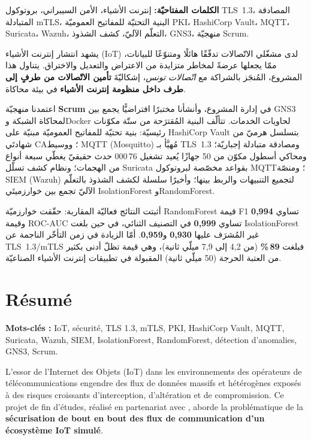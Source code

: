 \begin{Arabic}
\noindent\textbf{الكلمات المفتاحيّة:} إنترنت الأشياء، الأمن السيبراني، بروتوكول TLS~1.3، المصادقة المتبادلة mTLS، البنية التحتيّة للمفاتيح العموميّة PKI، HashiCorp Vault، MQTT، Suricata، Wazuh، التعلّم الآليّ، كشف الشذوذ، GNS3، منهجيّة Scrum.

\noindent يشهد انتشار إنترنت الأشياء (IoT) لدى مشغّلي الاتّصالات تدفّقًا هائلًا ومتنوّعًا للبيانات، ممّا يجعلها عرضةً لمخاطر متزايدة من الاعتراض والتعديل والاختراق. يتناول هذا المشروع، المُنجَز بالشراكة مع \emph{اتّصالات تونس}، إشكاليّةَ \textbf{تأمين الاتّصالات من طرفٍ إلى طرف داخل منظومة إنترنت الأشياء} في بيئة محاكاة.

\noindent اعتمدنا منهجيّة \textbf{Scrum} في إدارة المشروع، وأنشأنا مختبرًا افتراضيًّا يجمع بين GNS3 لمحاكاة الشبكة وDocker لحاويات الخدمات. تتألّف البنية المُقترَحة من ستّة مكوّنات رئيسيّة: بنية تحتيّة للمفاتيح العموميّة مبنيّة على HashiCorp Vault بتسلسل هرميّ من شهادتَي CA؛ ووسيط MQTT (Mosquitto) مُهيَّأ بـ TLS~1.3 ومصادقة متبادلة إجباريّة؛ ومحاكي أسطول مكوّن من 50 جهازًا يُعيد تشغيل 76\,000 حدث حقيقيّ يغطّي سبعة أنواع من الهجمات؛ ونظام كشف تسلّل Suricata بقواعد مخصّصة لبروتوكول MQTT؛ ومنصّة SIEM (Wazuh) لتجميع التنبيهات والربط بينها؛ وأخيرًا سلسلة لكشف الشذوذ بالتعلّم الآليّ تجمع بين خوارزميتَي IsolationForest وRandomForest.

\noindent أثبتت النتائج فعاليّة المقاربة: حقّقت خوارزميّة RandomForest قيمة F1 تساوي \textbf{0,994} وقيمة ROC-AUC تساوي \textbf{0,999} في التصنيف الثنائي، في حين بلغت IsolationForest غير المُشرَف عليها \textbf{0,930} و\textbf{0,959}. أمّا الزيادة في زمن التأخّر الناجمة عن TLS~1.3/mTLS فبلغت \textbf{89\,\%} (من 4{,}2 إلى 7{,}9 ميلّي ثانية)، وهي قيمة تظلّ أدنى بكثير من العتبة الحرجة (50 ميلّي ثانية) المقبولة في تطبيقات إنترنت الأشياء الصناعيّة.
\end{Arabic}

\cleardoublepage
\chapter*{Résumé}

\textbf{Mots-clés :} IoT, sécurité, TLS 1.3, mTLS, PKI, HashiCorp Vault, MQTT, Suricata, Wazuh, SIEM, IsolationForest, RandomForest, détection d'anomalies, GNS3, Scrum.

\vspace{0.5cm}

L'essor de l'Internet des Objets (IoT) dans les environnements des opérateurs de télécommunications engendre des flux de données massifs et hétérogènes exposés à des risques croissants d'interception, d'altération et de compromission. Ce projet de fin d'études, réalisé en partenariat avec \TT{}, aborde la problématique de la \textbf{sécurisation de bout en bout des flux de communication d'un écosystème IoT simulé}.

